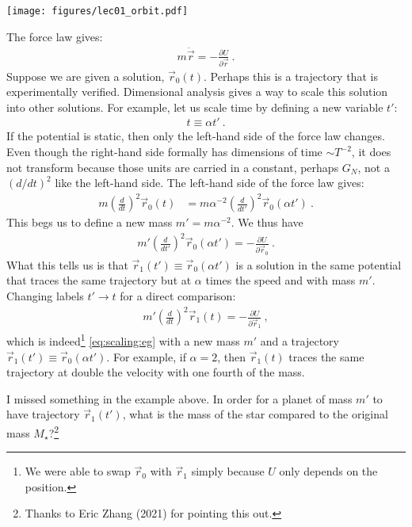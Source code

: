 \begin{center}
\texttt{[image: figures/lec01\_orbit.pdf]}
\end{center}

The force law gives:
\begin{align}
  m 
  \ddot{\vec{r}} = - \frac{\partial U}{\partial\vec{r}} \ .
  \label{eq:scaling:eg}
\end{align}
Suppose we are given a solution, $\vec r_0(t)$. Perhaps this is a trajectory that is experimentally verified. Dimensional analysis gives a way to scale this solution into other solutions. For example, let us scale time by defining a new variable $t'$:
\begin{align}
  t \equiv \alpha t' \ .
\end{align}
If the potential is static, then only the left-hand side of the force law changes. Even though the right-hand side formally has dimensions of time $\sim T^{-2}$, it does not transform because those units are carried in a constant, perhaps $G_N$, not a $(d/dt)^2$ like the left-hand side. The left-hand side of the force law gives:
\begin{align}
  m\left(\frac{d}{dt}\right)^2 \vec r_0(t) 
  &=
  m\alpha^{-2} \left(\frac{d}{dt'}\right)^2 \vec r_0(\alpha t') \ .
\end{align}
This begs us to define a new mass $m' = m\alpha^{-2}$. We thus have
\begin{align}
   m' \left(\frac{d}{dt'}\right)^2 {\vec{r}_0}(\alpha t')
  = - \frac{\partial U}{\partial\vec{r}_0} \ .
\end{align}
What this tells us is that $\vec r_1(t') \equiv \vec{r}_0(\alpha t')$ is a solution in the same potential that traces the same trajectory but at $\alpha$ times the speed and with mass $m'$. Changing labels $t'\to t$ for a direct comparison:
\begin{align}
   m' \left(\frac{d}{dt}\right)^2 {\vec{r}_1}(t)
  = - \frac{\partial U}{\partial\vec{r}_1} \ ,
\end{align}
which is indeed\footnote{We were able to swap $\vec r_0$ with $\vec r_1$ simply because $U$ only depends on the position.} \eqref{eq:scaling:eg} with a new mass $m'$ and a trajectory $\vec r_1(t') \equiv \vec{r}_0(\alpha t')$. For example, if $\alpha = 2$, then $\vec r_1(t)$ traces the same trajectory at double the velocity with one fourth of the mass.

\begin{exercise} 
I missed something in the example above. In order for a planet of mass $m'$ to have trajectory $\vec r_1(t')$, what is the mass of the star compared to the original mass $M_\star$?\footnote{Thanks to Eric Zhang (2021) for pointing this out.} 
\end{exercise}

